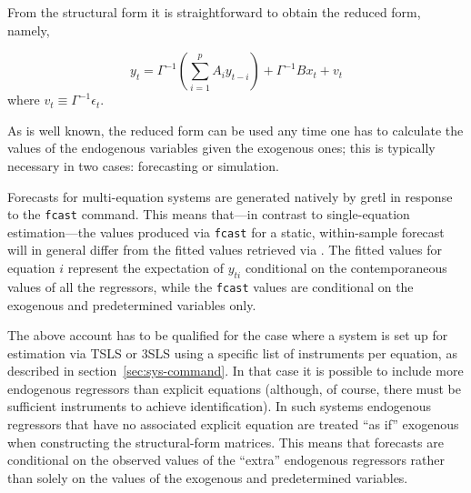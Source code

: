 From the structural form it is straightforward to obtain the reduced
form, namely,

\begin{equation}
  \label{eq:VAR-reduced-form}
  y_t = \Gamma^{-1} \left(\sum_{i=1}^p A_i y_{t-i}\right)
  + \Gamma^{-1} B x_t + v_t
\end{equation}
where $v_t \equiv \Gamma^{-1}\epsilon_t$.

As is well known, the reduced form can be used any time one has to
calculate the values of the endogenous variables given the exogenous
ones; this is typically necessary in two cases: forecasting or simulation.

Forecasts for multi-equation systems are generated natively by gretl
in response to the \texttt{fcast} command. This means that---in
contrast to single-equation estimation---the values produced via
\texttt{fcast} for a static, within-sample forecast will in general
differ from the fitted values retrieved via
. The fitted values for equation
$i$ represent the expectation of $y_{ti}$ conditional on the
contemporaneous values of all the regressors, while the \texttt{fcast}
values are conditional on the exogenous and predetermined variables
only.

The above account has to be qualified for the case where a system is
set up for estimation via TSLS or 3SLS using a specific list of
instruments per equation, as described in
section~\ref{sec:sys-command}. In that case it is possible to include
more endogenous regressors than explicit equations (although, of
course, there must be sufficient instruments to achieve
identification). In such systems endogenous regressors that have no
associated explicit equation are treated ``as if'' exogenous when
constructing the structural-form matrices. This means that forecasts
are conditional on the observed values of the ``extra'' endogenous
regressors rather than solely on the values of the exogenous and
predetermined variables. 


